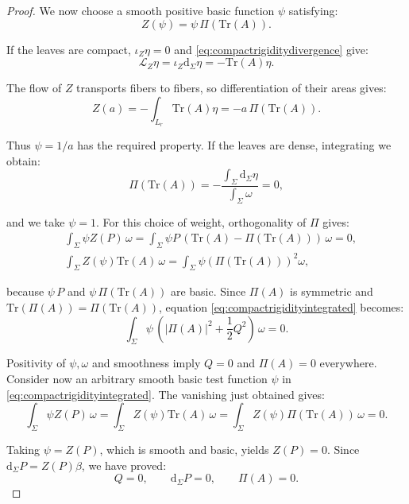 \documentclass[10pt,reqno,a4paper]{amsart}
\theoremstyle{plain}
\theoremstyle{definition}
\theoremstyle{remark}
\theoremstyle{remark}
\def\dd{\mathrm{d}}
\newcommand{\Tr}{\mathrm{Tr}}
\def\cL{\mathcal{L}}
\def\cL{\mathcal{L}}
\renewcommand{\(}{ (}
\renewcommand{\)}{ )}
\begin{document}
\begin{proof}
\noindent
We now choose a smooth positive basic function $\psi$ satisfying:
\begin{equation*}
Z(\psi)=\psi\,\Pi(\Tr(A)).
\end{equation*}
	
\noindent
If the leaves are compact, $\iota_Z\eta=0$ and \eqref{eq:compactrigiditydivergence} give:
\begin{equation*}
\cL_Z\eta = \iota_Z\dd_{\Sigma}\eta = -\Tr(A)\eta.
\end{equation*}
	
\noindent
The flow of $Z$ transports fibers to fibers, so differentiation of their areas gives:
\begin{equation*}
Z(a) = -\int_{L_r}\Tr(A)\eta = -a\,\Pi(\Tr(A)).
\end{equation*}
	
\noindent
Thus $\psi=1/a$ has the required property. If the leaves are dense, integrating we obtain:
\begin{equation*}
\Pi(\Tr(A)) = -\frac{\int_{\Sigma}\dd_{\Sigma}\eta}{\int_{\Sigma}\omega} =0,
\end{equation*}
	
\noindent
and we take $\psi=1$. For this choice of weight, orthogonality of $\Pi$ gives:
\begin{eqnarray*}
& \int_{\Sigma}\psi Z(P)\,\omega = \int_{\Sigma}\psi P \, (\Tr(A)-\Pi(\Tr(A)) )\, \omega =0, \\ 
& \int_{\Sigma}Z(\psi)\Tr(A)\,\omega =  \int_{\Sigma}\psi (\Pi(\Tr(A)) )^2\omega,
\end{eqnarray*}
	
\noindent
because $\psi\, P$ and $\psi\,\Pi(\Tr(A))$ are basic. Since $\Pi(A)$ is symmetric and $\Tr(\Pi(A))=\Pi(\Tr(A))$, equation \eqref{eq:compactrigidityintegrated} becomes:
\begin{equation*}
\int_{\Sigma}\psi\, (\vert\Pi(A)\vert^2+\frac{1}{2}Q^2 )\,\omega=0.
\end{equation*}
	
\noindent
Positivity of $\psi,\omega$ and smoothness imply $Q=0$ and $\Pi(A)=0$ everywhere. Consider now an arbitrary smooth basic test function $\psi$ in \eqref{eq:compactrigidityintegrated}. The vanishing just obtained gives:
\begin{equation*}
\int_{\Sigma}\psi Z(P)\,\omega = \int_{\Sigma}Z(\psi)\Tr(A)\,\omega
= \int_{\Sigma}Z(\psi)\Pi(\Tr(A))\,\omega =0 .
\end{equation*}
	
\noindent
Taking $\psi=Z(P)$, which is smooth and basic, yields $Z(P)=0$. Since $\dd_{\Sigma}P=Z(P)\beta$, we have proved:
\begin{equation}
\label{eq:compactrigiditymeanvanishing}
Q=0, \qquad \dd_{\Sigma}P=0, \qquad \Pi(A)=0.
\end{equation}
	

\end{proof}
\end{document}
